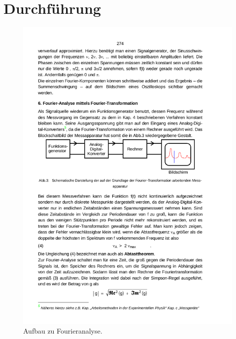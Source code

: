 \section{Durchführung}
\label{sec:Durchführung}

\begin{figure}[H]
  \centering
  \includegraphics{content/images/analyse2.png}
  \caption{Aufbau zu Fourieranalyse.}
  \label{fig:anal}
\end{figure}

